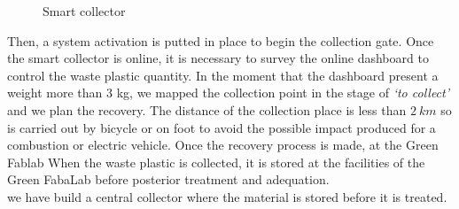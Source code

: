 \documentclass[
  11pt,
]{article}
\begin{document}
\begin{figure}

\begin{minipage}[t]{0.62\linewidth}

{\centering 


}

\end{minipage}%
%
\begin{minipage}[t]{0.38\linewidth}

{\centering 


}

\end{minipage}%

\caption{\label{fig-smart}Smart collector}

\end{figure}

Then, a system activation is putted in place to begin the collection
gate. Once the smart collector is online, it is necessary to survey the
online dashboard to control the waste plastic quantity. In the moment
that the dashboard present a weight more than 3 kg, we mapped the
collection point in the stage of \emph{`to collect'} and we plan the
recovery. The distance of the collection place is less than \(2~km\) so
is carried out by bicycle or on foot to avoid the possible impact
produced for a combustion or electric vehicle. Once the recovery process
is made, at the Green Fablab When the waste plastic is collected, it is
stored at the facilities of the Green FabaLab before posterior treatment
and adequation.\\
we have build a central collector where the material is stored before it
is treated.
\end{document}

